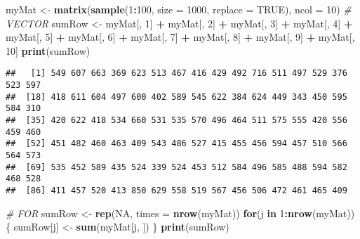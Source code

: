 \documentclass[]{book}
\newenvironment{Shaded}{\begin{snugshade}}{\end{snugshade}}
\newcommand{\KeywordTok}[1]{\textcolor[rgb]{0.13,0.29,0.53}{\textbf{#1}}}
\newcommand{\DataTypeTok}[1]{\textcolor[rgb]{0.13,0.29,0.53}{#1}}
\newcommand{\DecValTok}[1]{\textcolor[rgb]{0.00,0.00,0.81}{#1}}
\newcommand{\StringTok}[1]{\textcolor[rgb]{0.31,0.60,0.02}{#1}}
\newcommand{\CommentTok}[1]{\textcolor[rgb]{0.56,0.35,0.01}{\textit{#1}}}
\newcommand{\OtherTok}[1]{\textcolor[rgb]{0.56,0.35,0.01}{#1}}
\newcommand{\ControlFlowTok}[1]{\textcolor[rgb]{0.13,0.29,0.53}{\textbf{#1}}}
\newcommand{\OperatorTok}[1]{\textcolor[rgb]{0.81,0.36,0.00}{\textbf{#1}}}
\newcommand{\NormalTok}[1]{#1}
\theoremstyle{definition}
\theoremstyle{definition}
\theoremstyle{definition}
\theoremstyle{remark}
\begin{document}
\begin{Shaded}
\begin{Highlighting}[]
\NormalTok{myMat <-}\StringTok{ }\KeywordTok{matrix}\NormalTok{(}\KeywordTok{sample}\NormalTok{(}\DecValTok{1}\OperatorTok{:}\DecValTok{100}\NormalTok{, }\DataTypeTok{size =} \DecValTok{1000}\NormalTok{, }\DataTypeTok{replace =} \OtherTok{TRUE}\NormalTok{), }\DataTypeTok{ncol =} \DecValTok{10}\NormalTok{)}
\CommentTok{# VECTOR}
\NormalTok{sumRow <-}\StringTok{ }\NormalTok{myMat[, }\DecValTok{1}\NormalTok{] }\OperatorTok{+}\StringTok{ }\NormalTok{myMat[, }\DecValTok{2}\NormalTok{] }\OperatorTok{+}\StringTok{ }\NormalTok{myMat[, }\DecValTok{3}\NormalTok{] }\OperatorTok{+}\StringTok{ }\NormalTok{myMat[, }\DecValTok{4}\NormalTok{] }\OperatorTok{+}\StringTok{ }
\StringTok{  }\NormalTok{myMat[, }\DecValTok{5}\NormalTok{] }\OperatorTok{+}\StringTok{ }\NormalTok{myMat[, }\DecValTok{6}\NormalTok{] }\OperatorTok{+}\StringTok{ }\NormalTok{myMat[, }\DecValTok{7}\NormalTok{] }\OperatorTok{+}\StringTok{ }\NormalTok{myMat[, }\DecValTok{8}\NormalTok{] }\OperatorTok{+}\StringTok{ }
\StringTok{  }\NormalTok{myMat[, }\DecValTok{9}\NormalTok{] }\OperatorTok{+}\StringTok{ }\NormalTok{myMat[, }\DecValTok{10}\NormalTok{]}
\KeywordTok{print}\NormalTok{(sumRow)}
\end{Highlighting}
\end{Shaded}

\begin{verbatim}
##   [1] 549 607 663 369 623 513 467 416 429 492 716 511 497 529 376 523 597
##  [18] 418 611 604 497 600 402 589 545 622 384 624 449 343 450 595 584 310
##  [35] 420 622 418 534 660 531 535 570 496 464 511 575 555 420 556 459 460
##  [52] 451 482 460 463 409 543 486 527 415 455 456 594 457 510 566 564 573
##  [69] 535 452 589 435 524 339 524 453 512 584 496 585 488 594 582 468 528
##  [86] 411 457 520 413 850 629 558 519 567 456 506 472 461 465 409
\end{verbatim}

\begin{Shaded}
\begin{Highlighting}[]
\CommentTok{# FOR}
\NormalTok{sumRow <-}\StringTok{ }\KeywordTok{rep}\NormalTok{(}\OtherTok{NA}\NormalTok{, }\DataTypeTok{times =} \KeywordTok{nrow}\NormalTok{(myMat))}
\ControlFlowTok{for}\NormalTok{(j }\ControlFlowTok{in} \DecValTok{1}\OperatorTok{:}\KeywordTok{nrow}\NormalTok{(myMat))\{}
\NormalTok{  sumRow[j] <-}\StringTok{ }\KeywordTok{sum}\NormalTok{(myMat[j, ])}
\NormalTok{\}}
\KeywordTok{print}\NormalTok{(sumRow)}
\end{Highlighting}
\end{Shaded}
\end{document}

